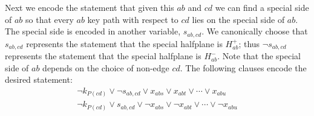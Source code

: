 \documentclass[12pt]{amsart}
\theoremstyle{remark}
\begin{document}
Next we encode
the statement that given this $ab$ and $cd$
we can find a special side of $ab$
so that every $ab$ key path with respect to $cd$
lies on the special side of $ab$.
The special side is encoded in another variable, $s_{ab, cd}$.
We canonically choose that $s_{ab, cd}$
represents the statement that the special halfplane is $H^{+}_{ab}$;
thus $\lnot s_{ab, cd}$
represents the statement that the special halfplane is $H^{-}_{ab}$.
Note that the special side of $ab$ depends on the choice of non-edge $cd$. 
The following clauses encode the desired statement:
\begin{gather}
\label{Cl:twoobs1}
%
\lnot k_{P(cd)} \lor  \lnot s_{ab, cd} \lor x_{abs} \lor x_{abt} \lor \cdots \lor x_{abu}\\ 
%
\label{Cl:twoobs2}
%
\lnot k_{P(cd)} \lor s_{ab,cd} \lor \lnot x_{abs} \lor \lnot x_{abt} \lor  \cdots \lor \lnot x_{abu} 
\end{gather}




%
\end{document}

